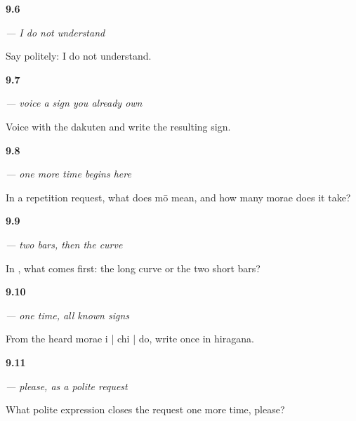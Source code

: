 \noindent\begin{minipage}[t]{\linewidth}
\raggedright
\hypertarget{review-JA-C09-wakarimasen-response}{\textbf{9.6}} \emph{ — I do not understand}\par
\small Say politely: I do not understand.
\end{minipage}\par\medskip

\noindent\begin{minipage}[t]{\linewidth}
\raggedright
\hypertarget{review-JA-W09-do-build}{\textbf{9.7}} \emph{ — voice a sign you already own}\par
\small Voice  with the dakuten and write the resulting sign.
\end{minipage}\par\medskip

\noindent\begin{minipage}[t]{\linewidth}
\raggedright
\hypertarget{review-JA-C09-mou-beats}{\textbf{9.8}} \emph{ — one more time begins here}\par
\small In a repetition request, what does mō mean, and how many morae does it take?
\end{minipage}\par\medskip

\noindent\begin{minipage}[t]{\linewidth}
\raggedright
\hypertarget{review-JA-W09-mo-order}{\textbf{9.9}} \emph{ — two bars, then the curve}\par
\small In , what comes first: the long curve or the two short bars?
\end{minipage}\par\medskip

\noindent\begin{minipage}[t]{\linewidth}
\raggedright
\hypertarget{review-JA-C09-ichido-dictation}{\textbf{9.10}} \emph{ — one time, all known signs}\par
\small From the heard morae i | chi | do, write once in hiragana.
\end{minipage}\par\medskip

\noindent\begin{minipage}[t]{\linewidth}
\raggedright
\hypertarget{review-JA-C09-onegaishimasu-job}{\textbf{9.11}} \emph{ — please, as a polite request}\par
\small What polite expression closes the request one more time, please?
\end{minipage}\par\medskip

